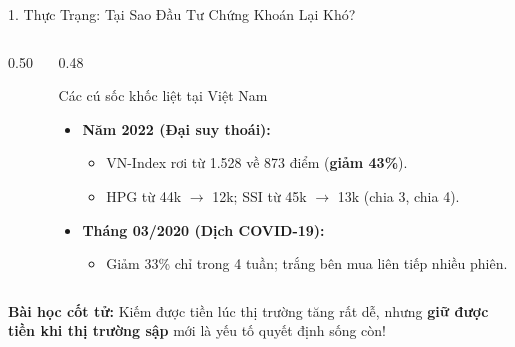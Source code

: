 \documentclass[aspectratio=169, 10pt]{beamer}
\begin{document}
\begin{frame}{1. Thực Trạng: Tại Sao Đầu Tư Chứng Khoán Lại Khó?}
  \begin{columns}[c]
    \begin{column}{0.50\textwidth}
    \end{column}

    \begin{column}{0.48\textwidth}
      \begin{block}{Các cú sốc khốc liệt tại Việt Nam}
        \begin{itemize}
          \item \textbf{Năm 2022 (Đại suy thoái):}
            \begin{itemize}
              \item VN-Index rơi từ 1.528 về 873 điểm (\textbf{giảm 43\%}).
              \item HPG từ 44k $\to$ 12k; SSI từ 45k $\to$ 13k (chia 3, chia 4).
            \end{itemize}
          \vspace{0.5ex}
          \item \textbf{Tháng 03/2020 (Dịch COVID-19):}
            \begin{itemize}
              \item Giảm 33\% chỉ trong 4 tuần; trắng bên mua liên tiếp nhiều phiên.
            \end{itemize}
        \end{itemize}
      \end{block}
    \end{column}
  \end{columns}

  \vspace{1ex}
  \begin{center}
    {\color{MainNavy}\textbf{Bài học cốt tử:}} Kiếm được tiền lúc thị trường tăng rất dễ, nhưng \textbf{giữ được tiền khi thị trường sập} mới là yếu tố quyết định sống còn!
  \end{center}
\end{frame}
\end{document}

